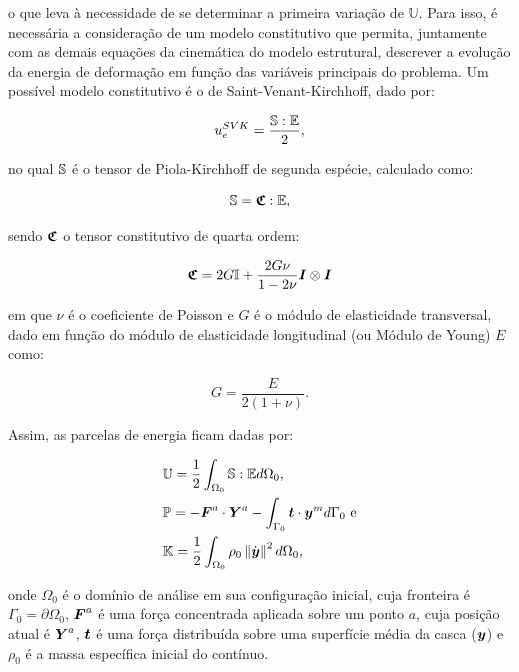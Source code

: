 \noindent o que leva à necessidade de se determinar a primeira variação de $\mathbb{U}$. Para isso, é necessária a consideração de um modelo constitutivo que permita, juntamente com as demais equações da cinemática do modelo estrutural, descrever a evolução da energia de deformação em função das variáveis principais do problema. Um possível modelo constitutivo é o de Saint-Venant-Kirchhoff, dado por:

\begin{equation}
    u_e^{SVK}=\frac{\boldsymbol{\mathbb{S}}:\mathbb{E}}{2}\text{,}
\end{equation}

\noindent no qual $\boldsymbol{\mathbb{S}}$ é o tensor de Piola-Kirchhoff de segunda espécie, calculado como:

\begin{equation}
    \boldsymbol{\mathbb{S}}=\boldsymbol{\mathfrak{C}}:\mathbb{E}\text{,}
    \label{eq:CSD-S}
\end{equation}

\noindent sendo $\boldsymbol{\mathfrak{C}}$ o tensor constitutivo de quarta ordem:

\begin{equation}
    \boldsymbol{\mathfrak{C}}=2G\mathbb{I}+\frac{2G\nu}{1-2\nu}\boldsymbol{I}\otimes\boldsymbol{I}
\end{equation}

\noindent em que $\nu$ é o coeficiente de Poisson e $G$ é o módulo de elasticidade transversal, dado em função do módulo de elasticidade longitudinal (ou Módulo de Young) $E$ como:

\begin{equation}
    G=\frac{E}{2(1+\nu)}\text{.}
\end{equation}

Assim, as parcelas de energia ficam dadas por:

\begin{subequations}
    \begin{align}
         & \mathbb{U}=\frac{1}{2}\int_{\Omega_0}{\boldsymbol{\mathbb{S}}:\mathbb{E} d\Omega_0}\text{,}                  \\
         & \mathbb{P}=-\boldsymbol{F}^a\cdot\boldsymbol{Y}^a-\int_{\Gamma_0}{\boldsymbol{t}\cdot\boldsymbol{y}^m d\Gamma_0}\text{ e} \\
         & \mathbb{K}=\frac{1}{2}\int_{\Omega_0}{\rho_0\left\lVert{\dot{\boldsymbol{y}}}\right\lVert^2 d\Omega_0}\text{,}
    \end{align}
\end{subequations}

\noindent onde $\Omega_0$ é o domínio de análise em sua configuração inicial, cuja fronteira é $\Gamma_0=\partial\Omega_0$, $\boldsymbol{F}^a$ é uma força concentrada aplicada sobre um ponto $a$, cuja posição atual é $\boldsymbol{Y}^a$, $\boldsymbol{t}$ é uma força distribuída sobre uma superfície média da casca ($\boldsymbol{y}$) e $\rho_0$ é a massa específica inicial do contínuo.

